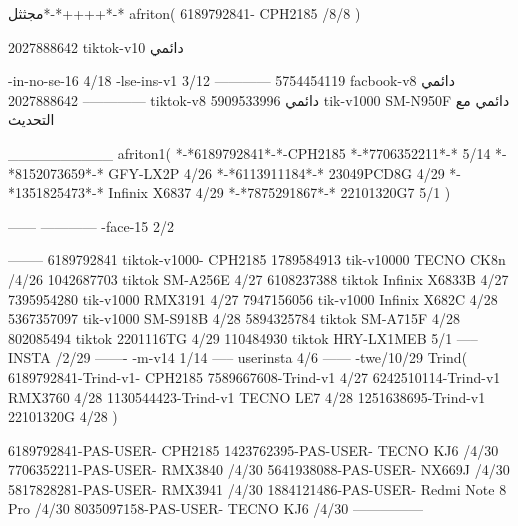 مجثثل*-*++++*-*
afriton(
6189792841- CPH2185  /8/8
)

2027888642 tiktok-v10
دائمي

-in-no-se-16 4/18
-lse-ins-v1 3/12
------------
5754454119 facbook-v8
دائمي
--------------
2027888642 tiktok-v8
دائمي
5909533996 tik-v1000  SM-N950F
دائمي مع التحديث

__________
afriton1(
*-*6189792841*-*-CPH2185
*-*7706352211*-* 5/14
*-*8152073659*-* GFY-LX2P 4/26
*-*6113911184*-* 23049PCD8G 4/29
*-*1351825473*-* Infinix X6837 4/29
*-*7875291867*-* 22101320G7 5/1
)


------
------------
-face-15 2/2

--------
6189792841 tiktok-v1000- CPH2185 
1789584913 tik-v10000 TECNO CK8n /4/26
1042687703 tiktok SM-A256E 4/27
6108237388 tiktok  Infinix X6833B 4/27
7395954280 tik-v1000  RMX3191 4/27
7947156056 tik-v1000  Infinix X682C 4/28
5367357097 tik-v1000  SM-S918B 4/28
5894325784 tiktok SM-A715F  4/28
802085494 tiktok 2201116TG  4/29
110484930 tiktok HRY-LX1MEB  5/1
-----
 INSTA /2/29
-------
-m-v14 1/14
-----
userinsta 4/6
------
-twe/10/29
Trind(
6189792841-Trind-v1- CPH2185 
7589667608-Trind-v1  4/27
6242510114-Trind-v1 RMX3760 4/28
1130544423-Trind-v1 TECNO LE7 4/28
1251638695-Trind-v1 22101320G 4/28
)

6189792841-PAS-USER- CPH2185 
1423762395-PAS-USER- TECNO KJ6 /4/30
7706352211-PAS-USER- RMX3840 /4/30
5641938088-PAS-USER- NX669J /4/30
5817828281-PAS-USER- RMX3941 /4/30
1884121486-PAS-USER- Redmi Note 8 Pro /4/30
8035097158-PAS-USER- TECNO KJ6 /4/30
    ---------------
